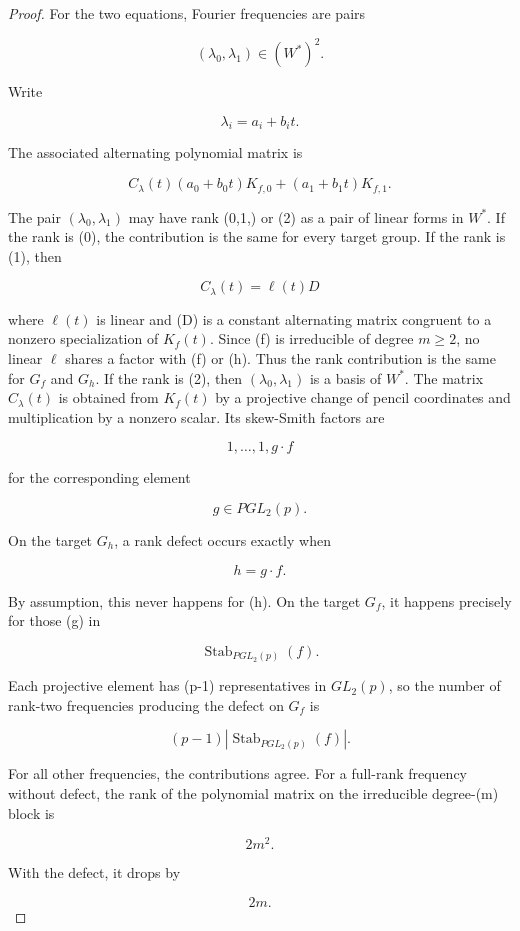\documentclass[11pt]{article}
\begin{document}
\begin{proof}
For the two equations, Fourier frequencies are pairs

\[
(\lambda_0,\lambda_1)\in (W^*)^2.
\]

Write

\[
\lambda_i=a_i+b_i t.
\]

The associated alternating polynomial matrix is

\[
C_{\lambda}(t)
(a_0+b_0t)K_{f,0}
+
(a_1+b_1t)K_{f,1}.
\tag{15.4}
\]

The pair $(\lambda_0,\lambda_1)$ may have rank (0,1,) or (2) as a pair of linear forms in $W^*$. If the rank is (0), the contribution is the same for every target group. If the rank is (1), then

\[
C_\lambda(t)=\ell(t)D
\]

where $\ell(t)$ is linear and (D) is a constant alternating matrix congruent to a nonzero specialization of $K_f(t)$. Since (f) is irreducible of degree $m\ge2$, no linear $\ell$ shares a factor with (f) or (h). Thus the rank contribution is the same for $G_f$ and $G_h$. If the rank is (2), then $(\lambda_0,\lambda_1)$ is a basis of $W^*$. The matrix $C_\lambda(t)$ is obtained from $K_f(t)$ by a projective change of pencil coordinates and multiplication by a nonzero scalar. Its skew-Smith factors are

\[
1,\ldots,1,g\cdot f
\]

for the corresponding element

\[
g\in PGL_2(p).
\]

On the target $G_h$, a rank defect occurs exactly when

\[
h=g\cdot f.
\]

By assumption, this never happens for (h). On the target $G_f$, it happens precisely for those (g) in

\[
\operatorname{Stab}_{PGL_2(p)}(f).
\]

Each projective element has (p-1) representatives in $GL_2(p)$, so the number of rank-two frequencies producing the defect on $G_f$ is

\[
(p-1)|\operatorname{Stab}_{PGL_2(p)}(f)|.
\]

For all other frequencies, the contributions agree. For a full-rank frequency without defect, the rank of the polynomial matrix on the irreducible degree-(m) block is

\[
2m^2.
\]

With the defect, it drops by

\[
2m.
\]


\end{proof}
\end{document}
